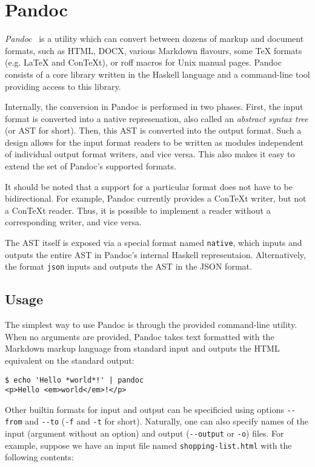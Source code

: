 \documentclass[
  digital,     %
  oneside,     %
  nosansbold,  %
  nocolorbold, %
  lof,         %
  nolot,       %
]{fithesis4}
\begin{document}
\section{Pandoc}
\emph{Pandoc}~\cite{pandoc} is a utility which can convert between dozens of markup and document formats, such as HTML, DOCX, various Markdown flavours, some \TeX{} formats (e.g. \LaTeX{} and Con\TeX{}t), or roff macros for Unix manual pages. Pandoc consists of a core library written in the Haskell language and a command-line tool providing access to this library.

Internally, the conversion in Pandoc is performed in two phases. First, the input format is converted into a native represenation, also called an \emph{abstract syntax tree} (or AST for short). Then, this AST is converted into the output format. Such a design allows for the input format readers to be written as modules independent of individual output format writers, and vice versa. This also makes it easy to extend the set of Pandoc's supported formats.

It should be noted that a support for a particular format does not have to be bidirectional. For example, Pandoc currently provides a Con\TeX{}t writer, but not a Con\TeX{}t reader. Thus, it is possible to implement a reader without a corresponding writer, and vice versa.

The AST itself is exposed via a special format named \texttt{native}, which inputs and outputs the entire AST in Pandoc's internal Haskell representaion. Alternatively, the format \texttt{json} inputs and outputs the AST in the JSON format.

\subsection{Usage}

The simplest way to use Pandoc is through the provided command-line utility. When no arguments are provided, Pandoc takes text formatted with the Markdown markup language from standard input and outputs the HTML equivalent on the standard output:

\noindent
\begin{lstlisting}
$ echo 'Hello *world*!' | pandoc
<p>Hello <em>world</em>!</p>
\end{lstlisting}

\noindent
Other builtin formats for input and output can be specificied using options \texttt{-{}-from} and \texttt{-{}-to} (\texttt{-f} and \texttt{-t} for short). Naturally, one can also specify names of the input (argument without an option) and output (\texttt{-{}-output} or \texttt{-o}) files. For example, suppose we have an input file named \texttt{shopping-list.html} with the following contents:
\end{document}
